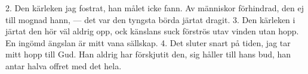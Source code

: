 2.  Den kärleken jag fostrat, han målet icke fann.
    Av människor förhindrad, den ej till mognad hann,
    — det var den tyngsta börda järtat dragit.
3.  Den kärleken i järtat den hör väl aldrig opp,
    ock känslans suck förströs utav vinden utan hopp.
    En ingömd ängslan är mitt vana sällskap.
4.  Det sluter snart på tiden, jag tar mitt hopp till Gud.
    Han aldrig har förskjutit den, sig håller till hans bud,
    han antar halva offret med det hela.
